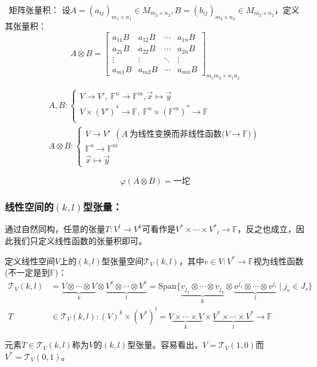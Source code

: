 \documentclass[zihao=-4,UTF8]{report}
\def\F{\mathbb{F}}
\theoremstyle{mystyle} %
\begin{document}
\ 矩阵张量积：
设$A=(a_{ij})_{m_1\times n_1}\in M_{m_2\times n_2},B=(b_{ij})_{m_2\times n_2}\in M_{m_2\times n_2}$，定义其张量积：
\begin{equation*}
    A \otimes B = 
    \begin{bmatrix}  
        a_{11}B& a_{12}B& \cdots  & a_{1n}B \\  
        a_{21}B& a_{22}B& \cdots  & a_{2n}B \\  
        \vdots & \vdots & \ddots & \vdots \\  
        a_{m1}B& a_{m2}B& \cdots  & a_{mn}B  
    \end{bmatrix}_{m_1m_2\times n_1n_2}
\end{equation*}
{\par\color{gray}\small
\begin{align*}
    A,B: \begin{cases}
        V \longrightarrow V',\ \F^n \longrightarrow \F^m, \vec{x} \longmapsto \vec{y}\\
        V\times (V')^* \longrightarrow \F,\ \F^n \times (\F^m)^* \longrightarrow \F\\
    \end{cases}\\
    A\otimes B: \begin{cases}
        V \longrightarrow V'\ \ (A\ \text{为线性变换而非线性函数($V \longrightarrow \F$)}) \\
        \F^n \longrightarrow \F^m \\
        \vec{x} \longmapsto \vec{y}
    \end{cases}
\end{align*}
\par}
\begin{equation*}
    \varphi(A\otimes B) = \text{一坨}
\end{equation*}
\subsubsection{线性空间的$(k,l)$型张量：}
通过自然同构，任意的张量$T: V^l \longrightarrow V^k$可看作是${V^*\times\cdots\times V^*}_l \longrightarrow \F$，反之也成立，因此我们只定义线性函数的张量积即可。\par
定义线性空间$V$上的$(k,l)$型张量空间$\mathscr{T}_V(k, l)$，其中$v \in V : V^* \longrightarrow \F$视为线性函数(不一定是到$\F$)：
\begin{align*}
    \mathscr{T}_V(k, l) 
    & = \underbrace{V\otimes\cdots\otimes V}_k\otimes\underbrace{V^*\otimes\cdots\otimes V^*}_l 
    =\text{Span}\{\underbrace{v_{j_1} \otimes\cdots \otimes v_{j_k}}_k\otimes \underbrace{v^{j_1} \otimes\cdots \otimes v^{j_l}}_l\mid j_{r} \in J_{r}\} \\
    T &\in \mathscr{T}_V(k, l): (V)^k \times (V^*)^l = \underbrace{V\times\cdots\times V}_k\times\underbrace{V^*\times\cdots\times V^*}_l \longrightarrow \F
\end{align*}
{\par\color{gray}\small
元素$T\in \mathscr{T}_V(k, l)$称为$V$的$(k,l)$型张量。容易看出，$V = \mathscr{T}_V(1,0)$而$V^* = \mathscr{T}_V(0,1)$。
\par}
\end{document}
